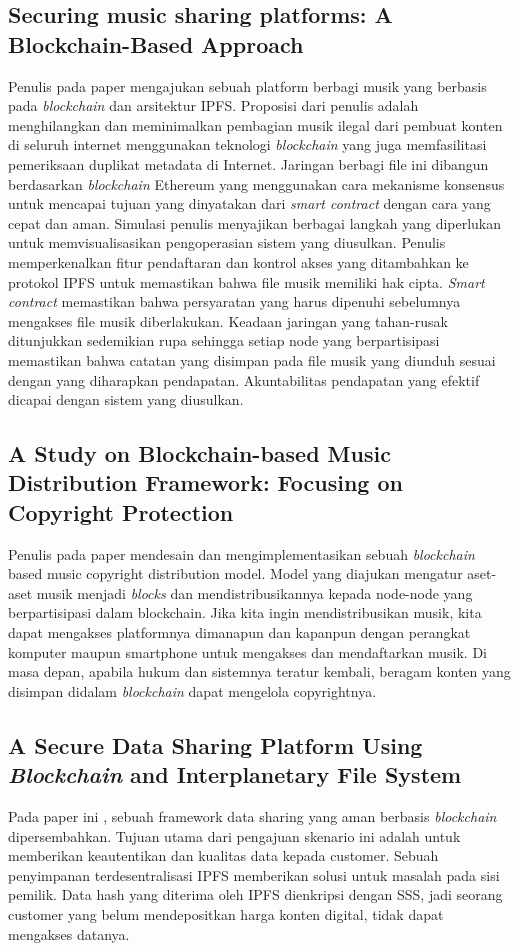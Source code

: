 \subsection{Securing music sharing platforms: A Blockchain-Based Approach}
Penulis pada paper \parencite{adjei2021securing} mengajukan sebuah platform berbagi musik yang berbasis pada \emph{blockchain} dan arsitektur IPFS.
Proposisi dari penulis adalah menghilangkan dan meminimalkan pembagian musik ilegal dari pembuat konten di seluruh
internet menggunakan teknologi \emph{blockchain} yang juga memfasilitasi pemeriksaan duplikat metadata di
Internet. Jaringan berbagi file ini dibangun berdasarkan \emph{blockchain} Ethereum yang menggunakan
cara mekanisme konsensus untuk mencapai tujuan yang dinyatakan dari \emph{smart contract} dengan cara yang cepat dan aman.
Simulasi penulis menyajikan berbagai langkah yang diperlukan untuk memvisualisasikan pengoperasian sistem yang diusulkan. Penulis memperkenalkan fitur pendaftaran dan kontrol akses yang ditambahkan ke protokol IPFS untuk memastikan bahwa
file musik memiliki hak cipta. \emph{Smart contract} memastikan bahwa persyaratan yang harus dipenuhi sebelumnya
mengakses file musik diberlakukan. Keadaan jaringan yang tahan-rusak ditunjukkan sedemikian rupa sehingga
setiap node yang berpartisipasi memastikan bahwa catatan yang disimpan pada file musik yang diunduh sesuai dengan yang diharapkan
pendapatan. Akuntabilitas pendapatan yang efektif dicapai dengan sistem yang diusulkan.

\subsection{A Study on Blockchain-based Music Distribution Framework: Focusing on Copyright Protection}

Penulis pada paper \parencite{kim2020study} mendesain dan mengimplementasikan sebuah \emph{blockchain} based music copyright distribution model.
Model yang diajukan mengatur aset-aset musik menjadi \emph{blocks} dan mendistribusikannya kepada node-node yang berpartisipasi dalam blockchain.
Jika kita ingin mendistribusikan musik, kita dapat mengakses platformnya dimanapun dan kapanpun dengan perangkat komputer maupun smartphone untuk mengakses dan
mendaftarkan musik. Di masa depan, apabila hukum dan sistemnya teratur kembali, beragam konten yang disimpan didalam \emph{blockchain} dapat mengelola copyrightnya.

\subsection{A Secure Data Sharing Platform Using \emph{Blockchain} and Interplanetary File System}
Pada paper ini \parencite{naz2019secure}, sebuah framework data sharing yang aman berbasis \emph{blockchain} dipersembahkan. Tujuan utama dari pengajuan skenario ini adalah untuk
memberikan keautentikan dan kualitas data kepada customer. Sebuah penyimpanan terdesentralisasi IPFS memberikan solusi untuk masalah pada sisi pemilik.
Data hash yang diterima oleh IPFS dienkripsi dengan SSS, jadi seorang customer yang belum mendepositkan harga konten digital, tidak dapat mengakses datanya.

